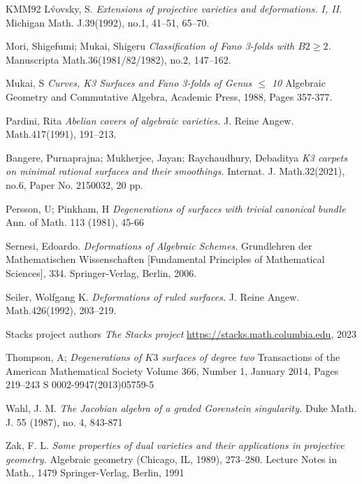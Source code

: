 \documentclass[11pt,twoside]{amsart}
\theoremstyle{plain}
\numberwithin{equation}{section}
\theoremstyle{definition}
\begin{document}
\begin{thebibliography}{KMM92}
L\'vovsky, S.
\emph{Extensions of projective varieties and deformations. I, II.}
Michigan Math. J.39(1992), no.1, 41–51, 65--70.





Mori, Shigefumi; Mukai, Shigeru
\emph{Classification of Fano 3-folds with $B2 \geq 2$.}
Manuscripta Math.36(1981/82/1982), no.2, 147–162.


Mukai, S
\emph{Curves, K3 Surfaces and Fano 3-folds of Genus $\leq$ 10}
Algebraic Geometry and Commutative Algebra, Academic Press,
1988, Pages 357-377.

  \color{black}
  


  \color{black}
Pardini, Rita
\emph{Abelian covers of algebraic varieties.}
J. Reine Angew. Math.417(1991), 191–213.

Bangere, Purnaprajna; Mukherjee, Jayan; Raychaudhury, Debaditya
\emph{K3 carpets on minimal rational surfaces and their smoothings.}
Internat. J. Math.32(2021), no.6, Paper No. 2150032, 20 pp.


Persson, U; Pinkham, H 
\emph{Degenerations of surfaces with trivial canonical bundle}
Ann. of Math. 113 (1981), 45-66




Sernesi, Edoardo.
\emph{Deformations of Algebraic Schemes.}
Grundlehren der Mathematischen Wissenschaften [Fundamental Principles of Mathematical Sciences], 334. Springer-Verlag, Berlin, 2006.

Seiler, Wolfgang K.
\emph{Deformations of ruled surfaces.}
J. Reine Angew. Math.426(1992), 203–219.

Stacks project authors
\emph{The Stacks project}
\url{https://stacks.math.columbia.edu}, 2023

Thompson, A;
\emph{Degenerations of $K3$ surfaces of degree two}
Transactions of the American Mathematical Society
Volume 366, Number 1, January 2014, Pages 219–243
S 0002-9947(2013)05759-5










Wahl, J. M. 
\emph{The Jacobian algebra of a graded Gorenstein singularity.}
Duke Math. J. 55 (1987), no. 4,
843-871

Zak, F. L.
\emph{Some properties of dual varieties and their applications in projective geometry.}
Algebraic geometry (Chicago, IL, 1989), 273–280.
Lecture Notes in Math., 1479
Springer-Verlag, Berlin, 1991

 






  

\end{thebibliography}
\end{document}
